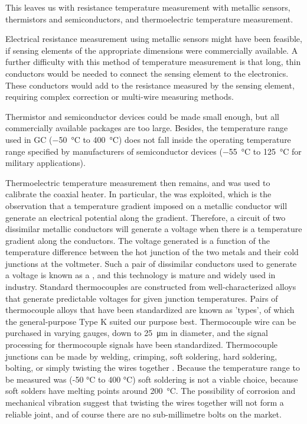This leaves us with resistance temperature measurement with metallic sensors,
thermistors and semiconductors, and thermoelectric temperature measurement.

Electrical resistance measurement using metallic sensors might have been
feasible, if sensing elements of the appropriate dimensions were commercially
available. A further difficulty with this method of temperature measurement is
that long, thin conductors would be needed to connect the sensing element to the
electronics. These conductors would add to the resistance measured by the
sensing element, requiring complex correction or multi-wire measuring methods.

Thermistor and semiconductor devices could be made small enough, but all
commercially available packages are too large. Besides, the temperature range
used in GC (\SI{-50}{\celsius} to \SI{400}{\celsius}) does not fall inside the
operating temperature range specified by manufacturers of semiconductor devices
(\SI{-55}{\celsius} to \SI{125}{\celsius} for military applications).

Thermoelectric temperature measurement then remains, and was used to calibrate
the coaxial heater. In particular, the  was exploited,
which is the observation that a temperature gradient imposed on a metallic
conductor will generate an electrical potential along the gradient. Therefore, a
circuit of two dissimilar metallic conductors will generate a voltage when there
is a temperature gradient along the conductors. The voltage generated is a
function of the temperature difference between the hot junction of the two
metals and their cold junctions at the voltmeter. Such a pair of dissimilar
conductors used to generate a voltage is known as a , and
this technology is mature and widely used in industry. Standard thermocouples
are constructed from well-characterized alloys that generate predictable
voltages for given junction temperatures. Pairs of thermocouple alloys that have been
standardized are known as 'types', of which the general-purpose Type K
suited our purpose best. Thermocouple wire can be purchased in varying gauges, down to
\SI{25}{\micro\metre} in diameter, and the signal processing for thermocouple
signals have been standardized. Thermocouple junctions can be made by welding,
crimping, soft soldering, hard soldering, bolting, or simply twisting the wires
together \autocite{McGee1988}. Because the temperature range to be
measured was ({-}50 \si{\celsius} to 400 \si{\celsius}) soft soldering is not a
viable choice, because soft solders have melting points around
\SI{200}{\celsius}. The possibility of corrosion and mechanical vibration
suggest that twisting the wires together will not form a reliable joint, and of
course there are no sub-millimetre bolts on the market.

